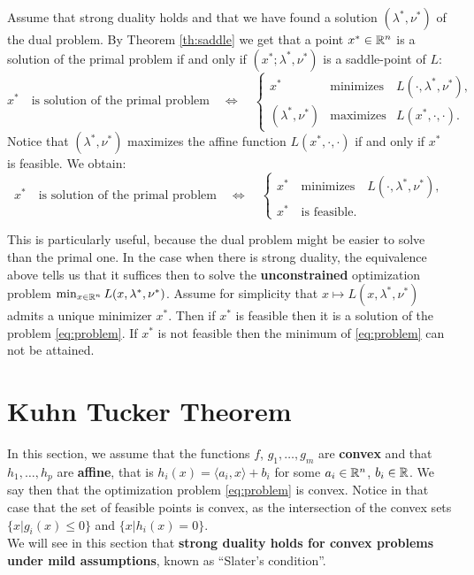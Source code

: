 \documentclass[11pt,nocut]{article}
\begin{document}
Assume that strong duality holds and that we have found a solution $(\lambda^*,\nu^*)$ of the dual problem. 
By Theorem \ref{th:saddle} we get that a point $x^* \in \mathbb{R}^n$ is a solution of the primal problem if and only if $(x^*;\lambda^*,\nu^*)$ is a saddle-point of $L$:
$$
x^* \quad \text{is solution of the primal problem} \quad
\Longleftrightarrow
\quad
\left\{
	\!\!
\begin{array}{lll}
	x^* & \text{minimizes} & L(\cdot, \lambda^*,\nu^*), \\
	(\lambda^*,\nu^*) & \text{maximizes} & L(x^*, \cdot, \cdot).
\end{array}
\right.
$$
Notice that $(\lambda^*,\nu^*)$ maximizes the affine function $L(x^*, \cdot,\cdot)$ if and only if $x^*$ is feasible. We obtain:
$$
x^* \quad \text{is solution of the primal problem} \quad
\Longleftrightarrow
\quad
\begin{cases}
	x^* \quad \text{minimizes} \quad L(\cdot, \lambda^*,\nu^*), \\
	x^* \quad \text{is feasible.}
\end{cases}
$$

This is particularly useful, because the dual problem might be easier to solve than the primal one. In the case when there is strong duality, the equivalence above tells us that it suffices then to solve the \textbf{unconstrained} optimization problem $\min_{x \in \mathbb{R}^n} L(x,\lambda^*,\nu^*)$.
Assume for simplicity that $x \mapsto L(x,\lambda^*,\nu^*)$ admits a unique minimizer $x^*$. Then if $x^*$ is feasible then it is a solution of the problem \eqref{eq:problem}. 
If $x^*$ is not feasible then the minimum of \eqref{eq:problem} can not be attained.

\section{Kuhn Tucker Theorem}\label{sec:kuhn_tucker}

In this section, we assume that the functions $f$, $g_1, \dots, g_m$ are \textbf{convex} and that $h_1, \dots, h_p$ are \textbf{affine}, that is $h_i(x) = \langle a_i,x \rangle + b_i$ for some $a_i \in \mathbb{R}^n$, $b_i \in \mathbb{R}$. We say then that the optimization problem \eqref{eq:problem} is convex.
Notice in that case that the set of feasible points is convex, as the intersection of the convex sets $\{x | g_i(x) \leq 0 \}$ and $\{x|h_i(x) =0\}$.
\\

We will see in this section that \textbf{strong duality holds for convex problems under mild assumptions}, known as ``Slater's condition''.
\end{document}
